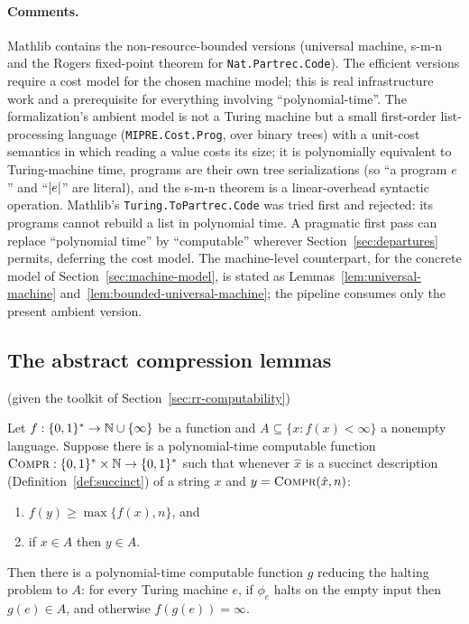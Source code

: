 \paragraph{Comments.} Mathlib contains the non-resource-bounded versions (universal
machine, s-m-n and the Rogers fixed-point theorem for \texttt{Nat.Partrec.Code}). The
efficient versions require a cost model for the chosen machine model; this is real
infrastructure work and a prerequisite for everything involving ``polynomial-time''.
The formalization's ambient model is not a Turing machine but a small first-order
list-processing language (\texttt{MIPRE.Cost.Prog}, over binary trees) with a unit-cost
semantics in which reading a value costs its size; it is polynomially equivalent to
Turing-machine time, programs are their own tree serializations (so ``a program $e$''
and ``$\left\vert {e} \right\vert$'' are literal), and the s-m-n theorem is a linear-overhead syntactic
operation. Mathlib's \texttt{Turing.ToPartrec.Code} was tried first and rejected: its
programs cannot rebuild a list in polynomial time.
A pragmatic first pass can replace ``polynomial time'' by ``computable'' wherever
Section~\ref{sec:departures} permits, deferring the cost model. The machine-level
counterpart, for the concrete model of Section~\ref{sec:machine-model}, is stated as
Lemmas~\ref{lem:universal-machine} and~\ref{lem:bounded-universal-machine}; the
pipeline consumes only the present ambient version.

\subsection{The abstract compression lemmas}
\label{sec:rr-compression}

\effortEasy{} (given the toolkit of Section~\ref{sec:rr-computability})

\begin{lemma}
\label{lem:recursive-compression}
\leanok
Let $f : \{0,1\}^* \to \mathbb{N} \cup \{\infty\}$ be a function and $A \subseteq \{x : f(x) <
\infty\}$ a nonempty language. Suppose there is a polynomial-time computable function
$\textsc{Compr} : \{0,1\}^* \times \mathbb{N} \to \{0,1\}^*$ such that whenever $\hat{x}$ is a succinct
description (Definition~\ref{def:succinct}) of a string $x$ and $y = \textsc{Compr}(\hat{x},
n)$:
\begin{enumerate}
\item $f(y) \geq \max\{ f(x), n \}$, and
\item if $x \in A$ then $y \in A$.
\end{enumerate}
Then there is a polynomial-time computable function $g$ reducing the halting problem to
$A$: for every Turing machine $e$, if $\phi_e$ halts on the empty input then $g(e) \in
A$, and otherwise $f(g(e)) = \infty$.
\end{lemma}

